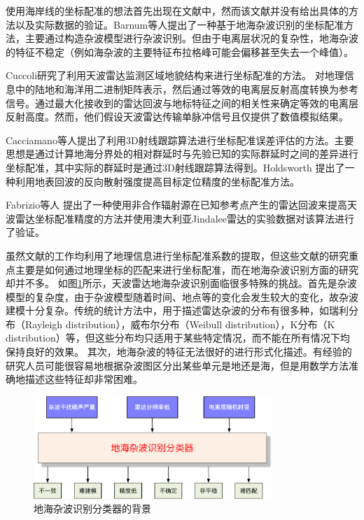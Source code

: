 使用海岸线的坐标配准的想法首先出现在文献\cite{wheadon1994ionospheric}中，然而该文献并没有给出具体的方法以及实际数据的验证。Barnum等人提出了一种基于地海杂波识别的坐标配准方法，主要通过构造杂波模型进行杂波识别。但由于电离层状况的复杂性，地海杂波的特征不稳定（例如海杂波的主要特征布拉格峰可能会偏移甚至失去一个峰值）。

Cuccoli研究了利用天波雷达监测区域地貌结构来进行坐标配准的方法。
对地理信息中的陆地和海洋用二进制矩阵表示，然后通过等效的电离层反射高度转换为参考信号。通过最大化接收到的雷达回波与地标特征之间的相关性来确定等效的电离层反射高度。然而，他们假设天波雷达传输单脉冲信号且仅提供了数值模拟结果。

Cacciamano等人提出了利用3D射线跟踪算法进行坐标配准误差评估的方法。主要思想是通过计算地海分界处的相对群延时与先验已知的实际群延时之间的差异进行坐标配准，其中实际的群延时是通过3D射线跟踪算法得到。Holdsworth 提出了一种利用地表回波的反向散射强度提高目标定位精度的坐标配准方法。

Fabrizio等人 提出了一种使用非合作辐射源在已知参考点产生的雷达回波来提高天波雷达坐标配准精度的方法并使用澳大利亚Jindalee雷达的实验数据对该算法进行了验证。

虽然文献\cite{barnum1998over, weijers1995oth, fabrizio2016using, wheadon1994ionospheric, cuccoli2009over, cuccoli2009over2, cuccoli2010sea, cuccoli2011coordinate, cacciamano2012coordinate}的工作均利用了地理信息进行坐标配准系数的提取，但这些文献的研究重点主要是如何通过地理坐标的匹配来进行坐标配准，而在地海杂波识别方面的研究却并不多。
如图\ref{fig:clutterproblem}所示，天波雷达地海杂波识别面临很多特殊的挑战。首先是杂波模型的复杂度，由于杂波模型随着时间、地点等的变化会发生较大的变化，故杂波建模十分复杂。传统的统计方法中，用于描述雷达杂波的分布有很多种，如瑞利分布（Rayleigh distribution），威布尔分布（Weibull distribution），K分布（K distribution）等，但这些分布均只适用于某些特定情况，而不能在所有情况下均保持良好的效果。
其次，地海杂波的特征无法很好的进行形式化描述。有经验的研究人员可能很容易地根据杂波图区分出某些单元是地还是海，但是用数学方法准确地描述这些特征却非常困难。
\begin{figure}[hbt]
\centering
\includegraphics[width=9cm]{figures/introduction/othr_classification.pdf}
\caption{地海杂波识别分类器的背景}
\label{fig:clutterproblem}
\end{figure}

